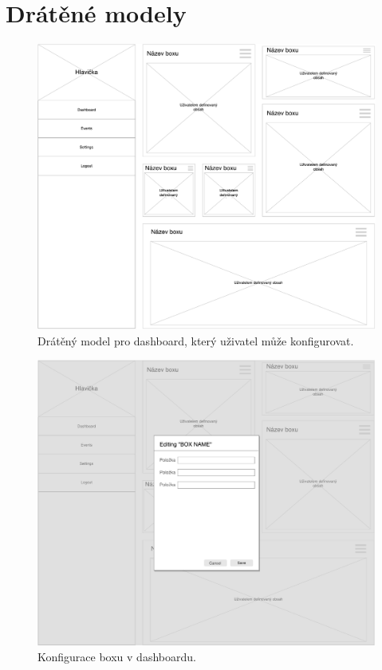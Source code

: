 \chapter{Drátěné modely}

\begin{figure}[ht]
    \centering
    \includegraphics[width=1\textwidth]{fig/wf_dashboard.pdf}
    \caption{Drátěný model pro dashboard, který uživatel může konfigurovat.} \label{wf:dashboard}
\end{figure}

\begin{figure}[ht]
    \centering
    \includegraphics[width=1\textwidth]{fig/wf_dashboard_edit.pdf}
    \caption{Konfigurace boxu v dashboardu.} \label{wf:dashboard_edit}
\end{figure}


